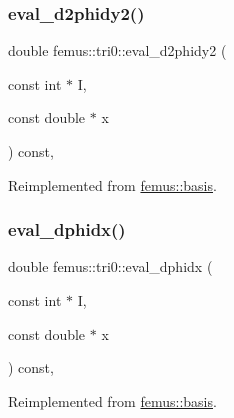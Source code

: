 \mbox{\label{classfemus_1_1tri0_aa01de141909bc67c1f293184b35d444b}} 
\subsubsection{\texorpdfstring{eval\+\_\+d2phidy2()}{eval\_d2phidy2()}}
{\footnotesize\ttfamily double femus\+::tri0\+::eval\+\_\+d2phidy2 (\begin{DoxyParamCaption}\item[{const int $\ast$}]{I,  }\item[{const double $\ast$}]{x }\end{DoxyParamCaption}) const\hspace{0.3cm}{\ttfamily [inline]}, {\ttfamily [virtual]}}



Reimplemented from \mbox{\hyperlink{classfemus_1_1basis_a0febb29fe4b32213ff8d6d428f7241cd}{femus\+::basis}}.

\mbox{\label{classfemus_1_1tri0_a5c6b15a2746a2d9b8b00d695644a3069}} 
\subsubsection{\texorpdfstring{eval\+\_\+dphidx()}{eval\_dphidx()}}
{\footnotesize\ttfamily double femus\+::tri0\+::eval\+\_\+dphidx (\begin{DoxyParamCaption}\item[{const int $\ast$}]{I,  }\item[{const double $\ast$}]{x }\end{DoxyParamCaption}) const\hspace{0.3cm}{\ttfamily [inline]}, {\ttfamily [virtual]}}



Reimplemented from \mbox{\hyperlink{classfemus_1_1basis_a4db7d29cf8a753ddbccc4a297dafa0bf}{femus\+::basis}}.

\mbox{\label{classfemus_1_1tri0_ac2d4659f00d3f914c7f29166f2e2ba71}} 
